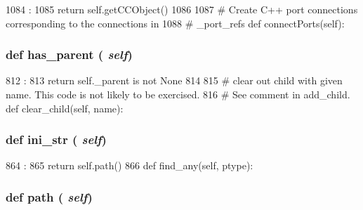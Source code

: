 \begin{DoxyCode}
1084                       :
1085         return self.getCCObject()
1086 
1087     # Create C++ port connections corresponding to the connections in
1088     # _port_refs
    def connectPorts(self):
\end{DoxyCode}
\hypertarget{classm5_1_1SimObject_1_1SimObject_a71e011e66af177233516716c34212661}{
\subsubsection[{has\_\-parent}]{\setlength{\rightskip}{0pt plus 5cm}def has\_\-parent ( {\em self})}}
\label{classm5_1_1SimObject_1_1SimObject_a71e011e66af177233516716c34212661}



\begin{DoxyCode}
812                         :
813         return self._parent is not None
814 
815     # clear out child with given name. This code is not likely to be exercised.
816     # See comment in add_child.
    def clear_child(self, name):
\end{DoxyCode}
\hypertarget{classm5_1_1SimObject_1_1SimObject_a33ebe6cd32bcbd15465fc28b9d94bf82}{
\subsubsection[{ini\_\-str}]{\setlength{\rightskip}{0pt plus 5cm}def ini\_\-str ( {\em self})}}
\label{classm5_1_1SimObject_1_1SimObject_a33ebe6cd32bcbd15465fc28b9d94bf82}



\begin{DoxyCode}
864                      :
865         return self.path()
866 
    def find_any(self, ptype):
\end{DoxyCode}
\hypertarget{classm5_1_1SimObject_1_1SimObject_a4767b0796ffc0da267b28b3f24776d97}{
\subsubsection[{path}]{\setlength{\rightskip}{0pt plus 5cm}def path ( {\em self})}}
\label{classm5_1_1SimObject_1_1SimObject_a4767b0796ffc0da267b28b3f24776d97}



